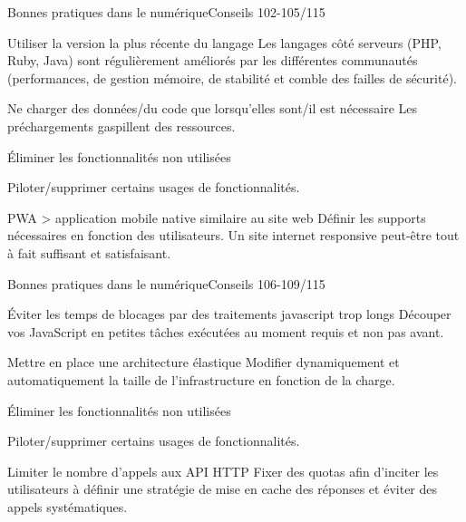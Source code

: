 

\begin{frame}{Bonnes pratiques dans le numérique}{Conseils 102-105/115}
\begin{block}{Utiliser la version la plus récente du langage}
Les langages côté serveurs (PHP, Ruby, Java) sont régulièrement améliorés par les différentes communautés (performances, de gestion mémoire, de stabilité et comble des failles de sécurité).
\end{block}

\begin{block}{Ne charger des données/du code que lorsqu'elles sont/il est nécessaire}
Les préchargements gaspillent des ressources.
\end{block}


\begin{block}{Éliminer les fonctionnalités non utilisées}

Piloter/supprimer certains usages de fonctionnalités.

\end{block}


\begin{block}{PWA > application mobile native similaire au site web}
 Définir les supports nécessaires en fonction des utilisateurs. Un site internet responsive peut-être tout à fait suffisant et satisfaisant.
\end{block}

\end{frame}

\begin{frame}{Bonnes pratiques dans le numérique}{Conseils 106-109/115}
\begin{block}{Éviter les temps de blocages par des traitements javascript trop longs}
 Découper vos JavaScript en petites tâches exécutées au moment requis et non pas avant.
\end{block}

\begin{block}{Mettre en place une architecture élastique}
 Modifier dynamiquement et automatiquement la taille de l'infrastructure en fonction de la charge. 
\end{block}


\begin{block}{Éliminer les fonctionnalités non utilisées}

Piloter/supprimer certains usages de fonctionnalités.

\end{block}


\begin{block}{Limiter le nombre d'appels aux API HTTP}
Fixer des quotas afin d'inciter les utilisateurs à définir une stratégie de mise en cache des réponses et éviter des appels systématiques. 
\end{block}

\end{frame}



